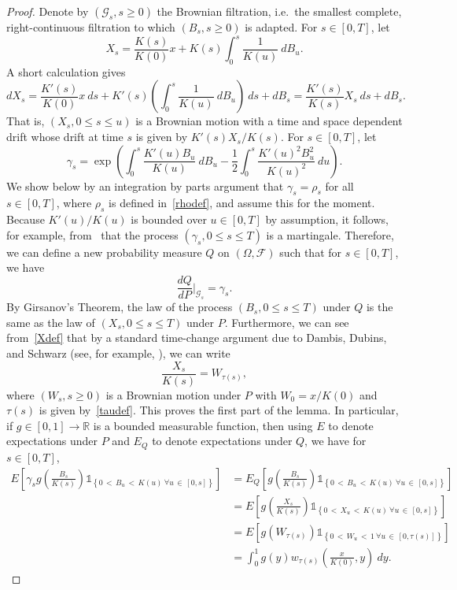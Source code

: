 \documentclass[AHL,Unicode,longabstracts,published]{cedram}
\newcommand\F{\mathcal{F}}
\newcommand{\clG}{\mathcal{G}}
\newcommand*\R{\mathbb{R}}
\newcommand{\1} {\mathds{1}}
\let\oldforall\forall
\renewcommand*{\forall}{\mathrel{\oldforall}}
\begin{document}
\begin{proof}
Denote by $(\clG_s, s \geq 0)$ the Brownian filtration, i.e.~the smallest complete, right-continuous filtration to which $(B_s, s\ge0)$ is adapted. For $s \in [0, T]$, let
\begin{equation}\label{Xdef}
X_s = \frac{K(s)}{K(0)} x + K(s) \int_0^s \frac{1}{K(u)} \: dB_u.
\end{equation}
A short calculation gives
\begin{equation}\label{sdeX}
dX_s = \frac{K'(s)}{K(0)} x \: ds + K'(s) \left(\int_0^s \frac{1}{K(u)} \: dB_u\right) \: ds + dB_s = \frac{K'(s)}{K(s)} X_s \: ds + dB_s.
\end{equation}
That is, $(X_s, 0 \leq s \leq u)$ is a Brownian motion with a time and space dependent drift whose drift at time $s$ is given by $K'(s) X_s/K(s)$. For $s \in [0, T]$, let
\[
\gamma_s = \exp \left(\int_0^s \frac{K'(u) B_u}{K(u)} \: dB_u - \frac{1}{2} \int_0^s \frac{K'(u)^2 B_u^2}{K(u)^2} \: du \right).
\]
We show below by an integration by parts argument that $\gamma_s = \rho_s$ for all $s\in[0,T]$, where $\rho_s$ is defined in~\eqref{rhodef}, and assume this for the moment. Because $K'(u)/K(u)$ is bounded over $u \in [0, T]$ by assumption, it follows, for example, from~\cite[Corollary~3.5.14]{ks} that the process $(\gamma_s, 0 \leq s \leq T)$ is a martingale. Therefore, we can define a new probability measure $Q$ on $(\Omega, \F)$ such that for $s \in [0, T]$, we have
\[
\frac{dQ}{dP} \bigg|_{\clG_s} = \gamma_s.
\]
By Girsanov's Theorem, the law of the process $(B_s, 0 \leq s \leq T)$ under $Q$ is the same as the law of $(X_s, 0 \leq s \leq T)$ under $P$.
Furthermore, we can see from~\eqref{Xdef} that by a standard time-change argument due to Dambis, Dubins, and Schwarz (see, for example, \cite[Theorem~3.4.6]{ks}), we can write
\[
\frac{X_s}{K(s)} = W_{\tau(s)},
\]
where $(W_s, s \geq 0)$ is a Brownian motion under $P$ with $W_0 = x/K(0)$ and $\tau(s)$ is given by~\eqref{taudef}. This proves the first part of the lemma. In particular, if $g \in [0, 1] \rightarrow \R$ is a bounded measurable function, then using $E$ to denote expectations under $P$ and $E_Q$ to denote expectations under $Q$, we have for $s \in [0, T]$,
\begin{align*}
E \left[\gamma_s g \left(\frac{B_s}{K(s)} \right) \1_{\left\{0\,<\,B_u\,<\,K(u) \: \forall u\,\in\,[0, s]\right\}} \right] &= E_Q \left[g \left(\frac{B_s}{K(s)} \right) \1_{\left\{0\,<\,B_u\,<\,K(u) \: \forall u\,\in\,[0, s]\right\}} \right] \\
&= E \left[g \left(\frac{X_s}{K(s)} \right) \1_{\left\{0\,<\,X_u\,<\,K(u) \: \forall u\,\in\,[0, s]\right\}} \right]\\
&= E\left[g\left(W_{\tau(s)}\right) \1_{\left\{0\,< \,W_u\,<\,1 \: \forall u\,\in\,\left[0, \tau(s)\right]\right\}} \right] \\
&= \int_0^1 g(y) w_{\tau(s)}\left(\frac x {K(0)}, y\right) \: dy.
\end{align*}


\end{proof}
\end{document}
